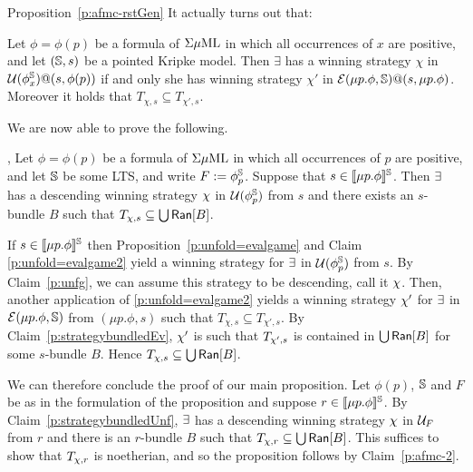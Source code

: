 \begin{proofof}{Proposition~\ref{p:afmc-rstGen}}
%
%
It actually turns out that:
\begin{claimfirst}\label{p:unfold=evalgame2}
Let $\phi = \phi(p)$ be a formula of $\Sigma\mu\mathrm{ML}$ in which all occurrences of $x$ are positive, and let $(\mathbb{S},s)$ be a pointed Kripke model. Then
$\exists$ has a winning strategy $\chi$ in $\mathcal{U}(\phi_{x}^{\mathbb{S}})@(s, \phi(p))$ if and only she has winning strategy $\chi'$ in $\mathcal{E}(\mu p.\phi,\mathbb{S})@(s, \mu p.\phi)$. Moreover it holds that $T_{\chi,s} \subseteq T_{\chi',s}$.
\end{claimfirst}
%
We are now able to prove the following.

\begin{claimfirst}\label{p:strategybundledUnf},
Let $\phi = \phi(p)$ be a formula of $\Sigma\mu\mathrm{ML}$
in which all occurrences of $p$ are 
positive, and let $\mathbb{S}$ be some LTS, and write $F := 
\phi_{p}^{\mathbb{S}}$. Suppose that $s \in [\![ \mu p.\phi ]\!]^{\mathbb{S}}$. Then $\exists$ has a descending winning strategy $\chi$ in $\mathcal{U}(\phi_{p}^{\mathbb{S}})$ from $s$ and there exists an $s$-bundle $B$ such 
that 
$T_{\chi,s} \subseteq \bigcup \mathsf{Ran}[B]$.
\end{claimfirst}
\begin{pfclaim} 
If $s \in [\![ \mu p.\phi ]\!]^{\mathbb{S}}$ then Proposition~\ref{p:unfold=evalgame}  and Claim \ref{p:unfold=evalgame2} yield a winning strategy for $\exists$ in $\mathcal{U}(\phi_{p}^{\mathbb{S}})$ from $s$. By Claim~\ref{p:unfg}, we can assume this strategy to be descending, call it $\chi$. Then, another application of \ref{p:unfold=evalgame2} yields a winning strategy $\chi'$ for $\exists$ in $\mathcal{E}(\mu p.\phi,\mathbb{S})$ from $(\mu p.\phi,s)$ such that $T_{\chi,s} \subseteq T_{\chi',s}$. By Claim~\ref{p:strategybundledEv}, $\chi'$ is such that $T_{\chi',s}$ is contained in $\bigcup \mathsf{Ran}[B]$ for some $s$-bundle $B$. Hence 
$T_{\chi,s} \subseteq \bigcup \mathsf{Ran}[B]$.
\end{pfclaim}


We can therefore conclude the proof of our main proposition.
Let $\phi(p)$, $\mathbb{S}$ and $F$ be as in the formulation of the proposition and suppose $r \in [\![ \mu p.\phi ]\!]^{\mathbb{S}}$. By Claim~\ref{p:strategybundledUnf}, $\exists$ has a descending winning strategy $\chi$ in $\mathcal{U}_{F}$ from $r$ and there is an $r$-bundle $B$ such 
that 
$T_{\chi,r} \subseteq \bigcup \mathsf{Ran}[B]$.
This suffices to show that $T_{\chi,r}$ is noetherian, and so the proposition 
follows by Claim~\ref{p:afmc-2}.
\end{proofof}


